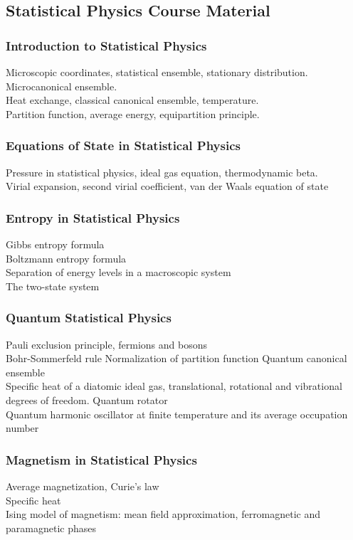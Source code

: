 \documentclass[11pt, a4paper]{article}
\begin{document}
\subsection{Statistical Physics Course Material}

\subsubsection{Introduction to Statistical Physics}
Microscopic coordinates, statistical ensemble, stationary distribution.\\
Microcanonical ensemble.\\
Heat exchange, classical canonical ensemble, temperature.\\
Partition function, average energy, equipartition principle.

\subsubsection{Equations of State in Statistical Physics}
Pressure in statistical physics, ideal gas equation, thermodynamic beta.\\
Virial expansion, second virial coefficient, van der Waals equation of state

\subsubsection{Entropy in Statistical Physics}
Gibbs entropy formula\\
Boltzmann entropy formula\\
Separation of energy levels in a macroscopic system\\
The two-state system

\subsubsection{Quantum Statistical Physics}
Pauli exclusion principle, fermions and bosons\\
Bohr-Sommerfeld rule
Normalization of partition function
Quantum canonical ensemble\\
Specific heat of a diatomic ideal gas, translational, rotational and vibrational degrees of freedom.
Quantum rotator\\
Quantum harmonic oscillator at finite temperature and its average occupation number

\subsubsection{Magnetism in Statistical Physics}
Average magnetization, Curie's law\\
Specific heat\\
Ising model of magnetism: mean field approximation, ferromagnetic and paramagnetic phases
\end{document}
